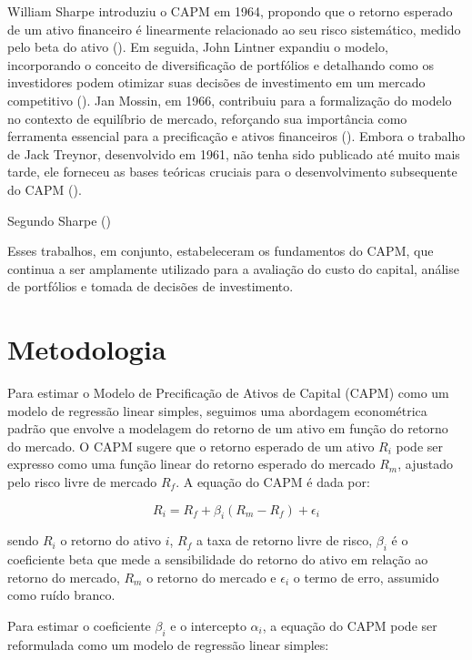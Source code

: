 \documentclass[
  12pt,
  a4paperpaper,
]{article}
\begin{document}
William Sharpe introduziu o CAPM em 1964, propondo que o retorno
esperado de um ativo financeiro é linearmente relacionado ao seu risco
sistemático, medido pelo beta do ativo
(). Em seguida, John Lintner
expandiu o modelo, incorporando o conceito de diversificação de
portfólios e detalhando como os investidores podem otimizar suas
decisões de investimento em um mercado competitivo
(). Jan Mossin, em 1966,
contribuiu para a formalização do modelo no contexto de equilíbrio de
mercado, reforçando sua importância como ferramenta essencial para a
precificação e ativos financeiros (). Embora o trabalho de Jack Treynor, desenvolvido em 1961, não
tenha sido publicado até muito mais tarde, ele forneceu as bases
teóricas cruciais para o desenvolvimento subsequente do CAPM
().

Segundo Sharpe ()

Esses trabalhos, em conjunto, estabeleceram os fundamentos do CAPM, que
continua a ser amplamente utilizado para a avaliação do custo do
capital, análise de portfólios e tomada de decisões de investimento.

\section{Metodologia}\label{sec-met}

Para estimar o Modelo de Precificação de Ativos de Capital (CAPM) como
um modelo de regressão linear simples, seguimos uma abordagem
econométrica padrão que envolve a modelagem do retorno de um ativo em
função do retorno do mercado. O CAPM sugere que o retorno esperado de um
ativo \(R_i\) pode ser expresso como uma função linear do retorno
esperado do mercado \(R_m\), ajustado pelo risco livre de mercado
\(R_f\). A equação do CAPM é dada por:

\[
R_i = R_f + \beta_i (R_m - R_f) + \epsilon_i
\]

sendo \(R_i\) o retorno do ativo \(i\), \(R_f\) a taxa de retorno livre
de risco, \(\beta_i\) é o coeficiente beta que mede a sensibilidade do
retorno do ativo em relação ao retorno do mercado, \(R_m\) o retorno do
mercado e \(\epsilon_i\) o termo de erro, assumido como ruído branco.

Para estimar o coeficiente \(\beta_i\) e o intercepto \(\alpha_i\), a
equação do CAPM pode ser reformulada como um modelo de regressão linear
simples:
\end{document}

